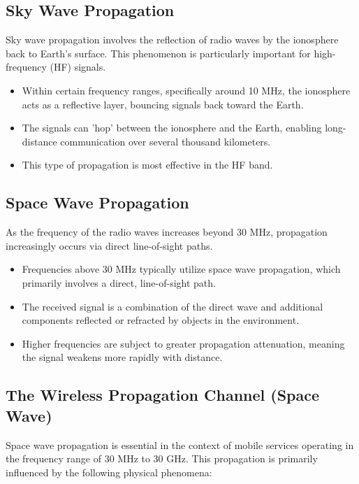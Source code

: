 \subsection*{Sky Wave Propagation}

Sky wave propagation involves the reflection of radio waves by the ionosphere back to Earth's surface. This phenomenon is particularly important for high-frequency (HF) signals.

\begin{itemize}
    \item Within certain frequency ranges, specifically around 10 MHz, the ionosphere acts as a reflective layer, bouncing signals back toward the Earth.
    \item The signals can 'hop' between the ionosphere and the Earth, enabling long-distance communication over several thousand kilometers.
    \item This type of propagation is most effective in the HF band.
\end{itemize}


\subsection*{Space Wave Propagation}

As the frequency of the radio waves increases beyond 30 MHz, propagation increasingly occurs via direct line-of-sight paths.

\begin{itemize}
    \item Frequencies above 30 MHz typically utilize space wave propagation, which primarily involves a direct, line-of-sight path.
    \item The received signal is a combination of the direct wave and additional components reflected or refracted by objects in the environment.
    \item Higher frequencies are subject to greater propagation attenuation, meaning the signal weakens more rapidly with distance.
\end{itemize}





\subsection*{The Wireless Propagation Channel (Space Wave)}

Space wave propagation is essential in the context of mobile services operating in the frequency range of 30 MHz to 30 GHz. This propagation is primarily influenced by the following physical phenomena:

